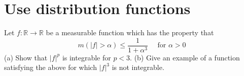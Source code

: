 \documentclass[lang=cn,11pt]{elegantbook}
\begin{document}
\section{Use distribution functions}
Let $f: \mathbb{R} \rightarrow \mathbb{R}$ be a measurable function which has the property that
$$
m(|f|>\alpha) \leq \frac{1}{1+\alpha^3} \quad \text { for } \alpha>0
$$
(a) Show that $|f|^p$ is integrable for $p<3$.
(b) Give an example of a function satisfying the above for which $|f|^3$ is not integrable.\newline
\newline
\newline
\newline
\newline
\newline
\newline
\newline
\newline
\end{document}
